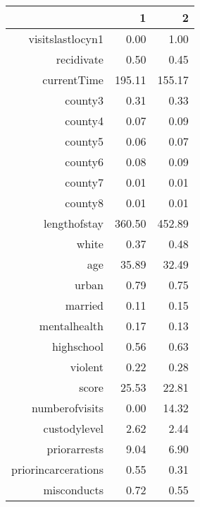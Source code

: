 \begin{table}[ht]
\centering
\begin{tabular}{rrr}
  \hline
 & 1 & 2 \\ 
  \hline
visitslastlocyn1 & 0.00 & 1.00 \\ 
  recidivate & 0.50 & 0.45 \\ 
  currentTime & 195.11 & 155.17 \\ 
  county3 & 0.31 & 0.33 \\ 
  county4 & 0.07 & 0.09 \\ 
  county5 & 0.06 & 0.07 \\ 
  county6 & 0.08 & 0.09 \\ 
  county7 & 0.01 & 0.01 \\ 
  county8 & 0.01 & 0.01 \\ 
  lengthofstay & 360.50 & 452.89 \\ 
  white & 0.37 & 0.48 \\ 
  age & 35.89 & 32.49 \\ 
  urban & 0.79 & 0.75 \\ 
  married & 0.11 & 0.15 \\ 
  mentalhealth & 0.17 & 0.13 \\ 
  highschool & 0.56 & 0.63 \\ 
  violent & 0.22 & 0.28 \\ 
  score & 25.53 & 22.81 \\ 
  numberofvisits & 0.00 & 14.32 \\ 
  custodylevel & 2.62 & 2.44 \\ 
  priorarrests & 9.04 & 6.90 \\ 
  priorincarcerations & 0.55 & 0.31 \\ 
  misconducts & 0.72 & 0.55 \\ 
   \hline
\end{tabular}
\end{table}

